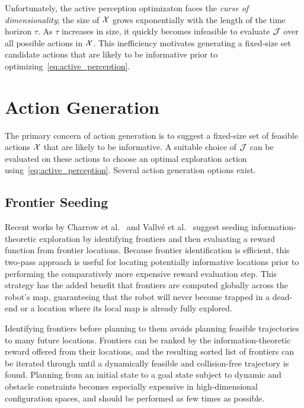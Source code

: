 Unfortunately, the active perception optimizaton faces the \textit{curse of dimensionality};
the size of $\mathcal{X}$ grows exponentially with the length of the time horizon $\tau$.
As $\tau$ increases in size, it quickly becomes infeasible to evaluate $\mathcal{J}$ over all
possible actions in $\mathcal{X}$. This inefficiency motivates generating a
fixed-size set candidate actions that are likely to be informative prior to optimizing~\eqref{eq:active_perception}.

\section{Action Generation}
\label{sec:action_generation}

The primary concern of action generation is to suggest a fixed-size set of feasible actions
$\mathcal{X}$ that are likely to be informative. A suitable choice of $\mathcal{J}$ can be
evaluated on these actions to choose an optimal exploration action
using~\eqref{eq:active_perception}. Several
action generation options exist.

\subsection{Frontier Seeding}
\label{subsec:frontier_seeding}

Recent works by Charrow et al.~\cite{charrow2015icra} and Vallv\'{e} et
al.~\cite{vallve2014dense} suggest seeding
information-theoretic exploration by identifying frontiers and then evaluating
a reward function from frontier locations. Because frontier
identification is efficient, this two-pass approach is useful for locating
potentially informative locations prior to performing the comparatively more
expensive reward evaluation step. This strategy has the added benefit that frontiers are computed
globally across the robot's map, guaranteeing that the robot will never become
trapped in a dead-end or a location where its local map is already fully
explored.

Identifying frontiers before planning to them avoids planning feasible
trajectories to many future locations. Frontiers can be ranked by the
information-theoretic reward offered from their locations, and the resulting sorted list
of frontiers can be iterated through until a dynamically feasible and
collision-free trajectory is found. Planning from an initial state to a goal state
subject to dynamic and obstacle constraints becomes especially expensive in
high-dimensional configuration spaces, and should be performed as few times as possible.

